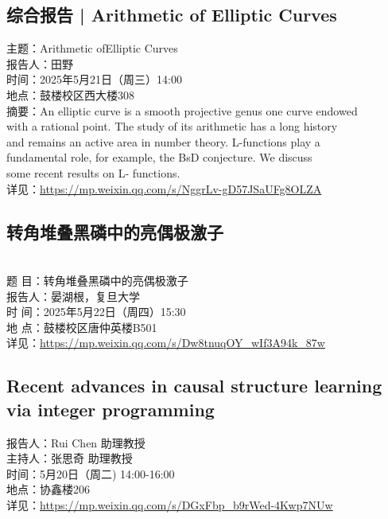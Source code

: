 \documentclass[letterpaper, 12pt]{article}
\begin{document}
\begin{multicols}{2}
\subsection{综合报告 | Arithmetic of Elliptic Curves} %
主题：Arithmetic ofElliptic Curves
\\报告人：田野
\\时间：2025年5月21日（周三）14:00
\\地点：鼓楼校区西大楼308
\\摘要：An elliptic curve is a smooth projective genus one curve endowed
\\with a rational point. The study of its arithmetic has a long history
\\and remains an active area in number theory. L-functions play a
\\fundamental role, for example, the BsD conjecture. We discuss
\\some recent results on L- functions.
\\详见：\url{https://mp.weixin.qq.com/s/NggrLv-gD57JSaUFg8OLZA}

\subsection{转角堆叠黑磷中的亮偶极激子} %
\\题   目：转角堆叠黑磷中的亮偶极激子
\\报告人：晏湖根，复旦大学
\\时   间：2025年5月22日（周四）15:30
\\地   点：鼓楼校区唐仲英楼B501
\\详见：\url{https://mp.weixin.qq.com/s/Dw8tnuqOY_wIf3A94k_87w}

\subsection{Recent advances in causal structure learning via integer programming} %
报告人：Rui Chen  助理教授
\\主持人：张思奇 助理教授
\\时间：5月20日（周二) 14:00-16:00
\\地点：协鑫楼206
\\详见：\url{https://mp.weixin.qq.com/s/DGxFbp_b9rWed-4Kwp7NUw}





\end{multicols}
\end{document}
